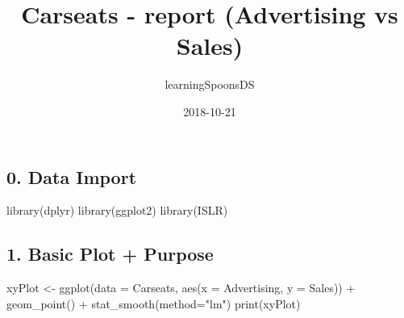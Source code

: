 \documentclass[a4paper]{article}
\title{Carseats - report (Advertising vs Sales)}
\author{learningSpoonsDS}
\date{2018-10-21}
\newenvironment{Shaded}{}{}
\newcommand{\KeywordTok}[1]{\textcolor[rgb]{0.00,0.00,1.00}{#1}}
\newcommand{\DataTypeTok}[1]{#1}
\newcommand{\DecValTok}[1]{#1}
\newcommand{\StringTok}[1]{\textcolor[rgb]{0.00,0.50,0.50}{#1}}
\newcommand{\CommentTok}[1]{\textcolor[rgb]{0.00,0.50,0.00}{#1}}
\newcommand{\OperatorTok}[1]{#1}
\newcommand{\NormalTok}[1]{#1}
\begin{document}
\maketitle

\subsection{0. Data Import}\label{data-import}

\begin{Shaded}
\begin{Highlighting}[]
\KeywordTok{library}\NormalTok{(dplyr)}
\KeywordTok{library}\NormalTok{(ggplot2)}
\KeywordTok{library}\NormalTok{(ISLR)}
\end{Highlighting}
\end{Shaded}

\begin{Shaded}
\end{Shaded}

\subsection{1. Basic Plot + Purpose}\label{basic-plot-purpose}

\begin{Shaded}
\begin{Highlighting}[]
\NormalTok{xyPlot <-}\StringTok{ }\KeywordTok{ggplot}\NormalTok{(}\DataTypeTok{data =}\NormalTok{ Carseats, }\KeywordTok{aes}\NormalTok{(}\DataTypeTok{x =}\NormalTok{ Advertising, }\DataTypeTok{y =}\NormalTok{ Sales)) }\OperatorTok{+}
\StringTok{  }\KeywordTok{geom_point}\NormalTok{() }\OperatorTok{+}\StringTok{ }\KeywordTok{stat_smooth}\NormalTok{(}\DataTypeTok{method=}\StringTok{"lm"}\NormalTok{)}
\KeywordTok{print}\NormalTok{(xyPlot)}
\end{Highlighting}
\end{Shaded}
\end{document}
